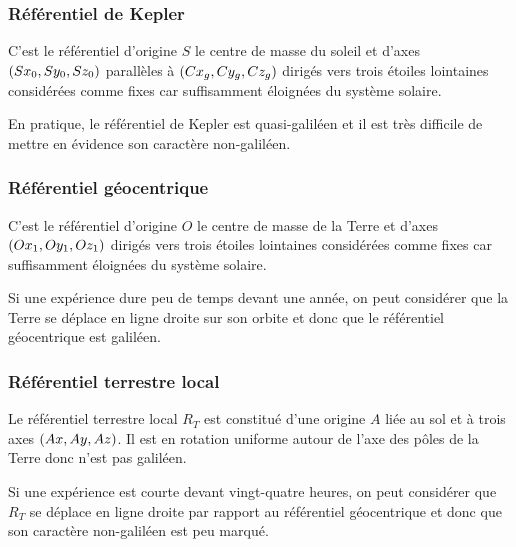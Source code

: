 \subsubsection{Référentiel de Kepler}

C'est le référentiel d'origine \(S\) le centre de masse du soleil et d'axes \(\left(Sx_0,Sy_0,Sz_0\right)\) parallèles à \(\left(Cx_g,Cy_g,Cz_g\right)\) dirigés vers trois étoiles lointaines considérées comme fixes car suffisamment éloignées du système solaire.

En pratique, le référentiel de Kepler est quasi-galiléen et il est très difficile de mettre en évidence son caractère non-galiléen.

\subsubsection{Référentiel géocentrique}

C'est le référentiel d'origine \(O\) le centre de masse de la Terre et d'axes \(\left(Ox_1,Oy_1,Oz_1\right)\) dirigés vers trois étoiles lointaines considérées comme fixes car suffisamment éloignées du système solaire.

Si une expérience dure peu de temps devant une année, on peut considérer que la Terre se déplace en ligne droite sur son orbite et donc que le référentiel géocentrique est galiléen.

\subsubsection{Référentiel terrestre local}

Le référentiel terrestre local \(R_T\) est constitué d'une origine \(A\) liée au sol et à trois axes \(\left(Ax,Ay,Az\right)\). Il est en rotation uniforme autour de l'axe des pôles de la Terre donc n'est pas galiléen.

Si une expérience est courte devant vingt-quatre heures, on peut considérer que \(R_T\) se déplace en ligne droite par rapport au référentiel géocentrique et donc que son caractère non-galiléen est peu marqué.

